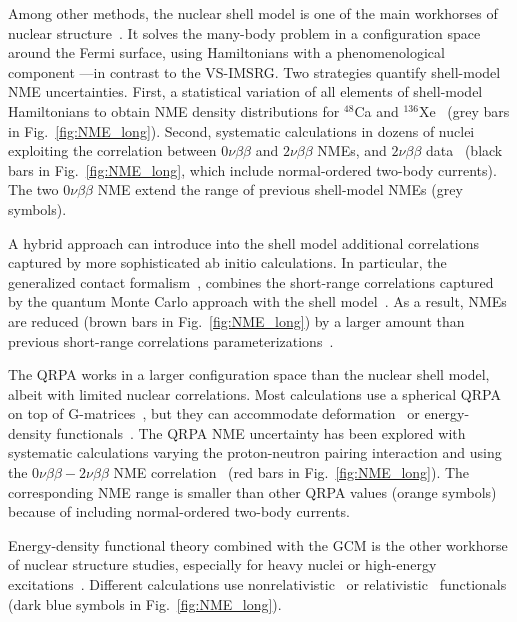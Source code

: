 Among other methods, the nuclear shell model is one of the main workhorses of nuclear structure~\cite{Caurier:2004gf,Otsuka:2018bqq,Brown:2001zz}. It solves the many-body problem in a configuration space around the Fermi surface, using Hamiltonians with a phenomenological component ---in contrast to the VS-IMSRG.
Two strategies quantify shell-model NME uncertainties. First, a statistical variation of all elements of shell-model Hamiltonians to obtain NME density distributions for $^{48}$Ca and $^{136}$Xe~\cite{Horoi:2022ley,Horoi:2023uah} (grey bars in Fig.~\ref{fig:NME_long}). Second, systematic calculations in dozens of nuclei exploiting the correlation between $0\nu\beta\beta$ and $2\nu\beta\beta$ NMEs, and $2\nu\beta\beta$ data~\cite{Jokiniemi:2022ayc} (black bars in Fig.~\ref{fig:NME_long}, which include normal-ordered two-body currents). The two $0\nu\beta\beta$ NME extend the range of previous shell-model NMEs (grey symbols).

A hybrid approach can introduce into the shell model additional correlations captured by more sophisticated ab initio calculations. In particular, the generalized contact formalism~\cite{Weiss:2016obx}, combines the short-range correlations captured by the quantum Monte Carlo approach with the shell model~\cite{Weiss:2021rig}. As a result, NMEs are reduced (brown bars in Fig.~\ref{fig:NME_long}) by a larger amount than previous short-range correlations parameterizations~\cite{Simkovic:2009pp}.

The QRPA
works in a larger configuration space than the nuclear shell model, albeit with limited nuclear correlations. Most calculations use a spherical QRPA on top of G-matrices~\cite{Hyvarinen:2015bda,Simkovic:2018hiq}, but they can accommodate deformation~\cite{Fang:2018tui} or energy-density functionals~\cite{Mustonen:2013zu}. The QRPA NME uncertainty has been explored with systematic calculations varying the proton-neutron pairing interaction and using the $0\nu\beta\beta-2\nu\beta\beta$ NME correlation~\cite{Jokiniemi:2022ayc} (red bars in Fig.~\ref{fig:NME_long}). The corresponding NME range is smaller than other QRPA values (orange symbols) because of including normal-ordered two-body currents.

Energy-density functional theory combined with the GCM is the other workhorse of nuclear structure studies, especially for heavy nuclei or high-energy excitations~\cite{Paar:2007bk,Robledo:2018cdj}. Different calculations use nonrelativistic~\cite{Rodriguez:2010mn,LopezVaquero:2013yji}
or relativistic~\cite{Yao:2014uta} functionals (dark blue symbols in Fig.~\ref{fig:NME_long}).

